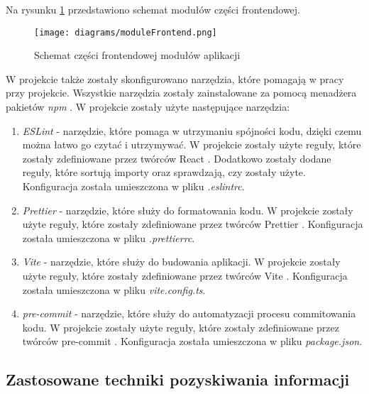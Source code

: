 Na rysunku \ref{module_frontend} przedstawiono schemat modułów części frontendowej.

\begin{figure}[H]
    \centering
    \texttt{[image: diagrams/moduleFrontend.png]}
    \caption{Schemat części frontendowej modułów aplikacji}
    \label{module_frontend}
\end{figure}

W projekcie także zostały skonfigurowano narzędzia, które pomagają w pracy przy projekcie. Wszystkie narzędzia zostały zainstalowane za pomocą menadżera pakietów \textit{npm} \cite{npm}. W projekcie zostały użyte następujące narzędzia:
\begin{enumerate}
    \item \textit{ESLint} \cite{ESLint} - narzędzie, które pomaga w utrzymaniu spójności kodu, dzięki czemu można łatwo go czytać i utrzymywać. W projekcie zostały użyte reguły, które zostały zdefiniowane przez twórców React \cite{React}. Dodatkowo zostały dodane reguły, które sortują importy oraz sprawdzają, czy zostały użyte. Konfiguracja została umieszczona w pliku \textit{.eslintrc}.
    \item \textit{Prettier} \cite{Prettier} - narzędzie, które służy do formatowania kodu. W projekcie zostały użyte reguły, które zostały zdefiniowane przez twórców Prettier \cite{Prettier}. Konfiguracja została umieszczona w pliku \textit{.prettierrc}.
    \item \textit{Vite} \cite{vite} - narzędzie, które służy do budowania aplikacji. W projekcie zostały użyte reguły, które zostały zdefiniowane przez twórców Vite \cite{vite}. Konfiguracja została umieszczona w pliku \textit{vite.config.ts}.
    \item \textit{pre-commit} \cite{pre_commit} - narzędzie, które służy do automatyzacji procesu commitowania kodu. W projekcie zostały użyte reguły, które zostały zdefiniowane przez twórców pre-commit \cite{pre_commit}. Konfiguracja została umieszczona w pliku \textit{package.json}.
\end{enumerate}

\subsection{Zastosowane techniki pozyskiwania informacji}

